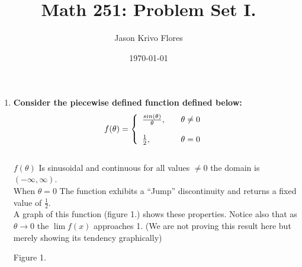 \documentclass{article}
\title{Math 251: Problem Set I.}
\author{Jason Krivo Flores}
\date{\today}
\begin{document}
\maketitle{}
%
\begin{enumerate}

\item {\bfseries Consider the piecewise defined function defined below:}\\
\[
  f(\theta) = \left\{ 
  \begin{array}{l l}
    \frac{ sin(\theta)}{\theta}, \quad &  \theta \neq 0\\
    \\
      \frac{1}{2},  \quad &  \theta= 0\\
  \end{array} \right. \\
\]
\\
$f(\theta)$ Is sinusoidal and continuous for all values $\neq 0$ the domain  is $(-\infty, \infty)$.\\ When $\theta = 0$ The function exhibits a ``Jump'' discontinuity and returns a fixed value of $ \frac{1}{2}$.\\
A graph of this function (figure 1.) shows these properties. Notice also that as $\theta \to 0$ the $ \lim f(x)$ approaches 1.
(We are not proving this result here but merely showing  its tendency graphically)\\
\vspace{2mm}

Figure 1.
\\ \\


\end{enumerate}
\end{document}
